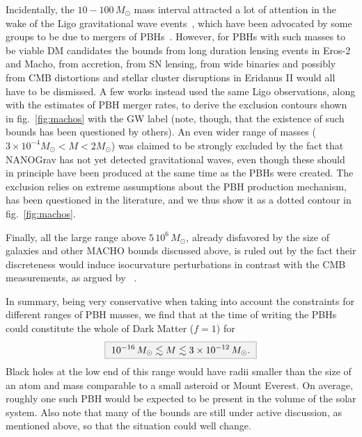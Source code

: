 Incidentally, the $10 - 100 \, M_\odot$ mass interval attracted a lot of attention in the wake of the {\sc Ligo} gravitational wave events~\cite{1602.03837}, which have been advocated by some groups to be due to mergers of PBHs~\cite{PBHandLIGO}. However, for PBHs with such masses to be viable DM candidates the bounds from long duration lensing events in {\sc Eros-2} and {\sc Macho}, from accretion, from SN lensing, from wide binaries and possibly from CMB distortions and stellar cluster disruptions in Eridanus II would all have to be dismissed. 
A few works \cite{PBHandLIGO}  instead used the same {\sc Ligo} observations, along with the estimates of PBH merger rates, to derive the exclusion contours shown in fig.~\ref{fig:machos}  with the GW label (note, though, that the existence of such bounds has been questioned by others).
An even wider range of masses ($3 \times 10^{-4} M_\odot < M < 2 M_\odot$) was claimed to be strongly excluded by the fact that {\sc NANOGrav} has not  yet detected gravitational waves, even though these should in principle have been  produced at the same time as the PBHs were created. The exclusion relies on extreme assumptions about the PBH production mechanism, has been questioned in the literature, and we thus show it 
as a dotted contour in fig.~\ref{fig:machos}.

Finally, all the large range above $5 \, 10^{6} \, M_\odot$, already disfavored by the size of galaxies and other MACHO bounds discussed above, is ruled out by the fact their discreteness would induce isocurvature perturbations in contrast with the CMB measurements, as argued by ~\cite{PBHconstraints}.



\medskip

In summary, being very conservative when taking into account the constraints for different ranges of PBH masses, we find that
at the time of writing the PBHs could constitute the whole of Dark Matter ($f=1$) for
\begin{equation} 
 \bbox{10^{-16}\,  M_\odot \lesssim M \lesssim 3\times10^{-12}\, M_\odot. }
 \label{eq:PBH}
\end{equation}
Black holes at the low end of this range would have radii smaller than the size of an atom and mass comparable to a small asteroid or Mount Everest. On average, roughly one such PBH would be expected to be present in the volume of the solar system.
Also note that many of the bounds are still under active discussion, as mentioned above, so that the situation could well change. 


